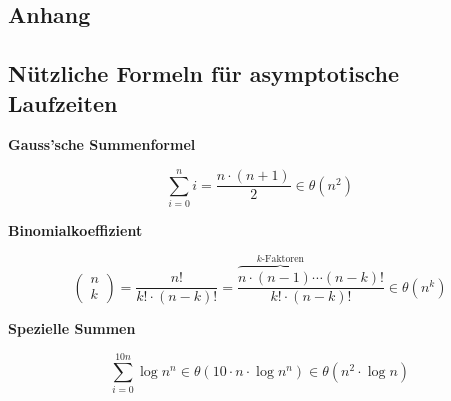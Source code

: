 \vspace{-4pt}
\begin{sectionbox}
\section{Anhang}
\subsection{Nützliche Formeln für asymptotische Laufzeiten}\medskip

\textbf{Gauss'sche Summenformel}\par\vspace{-4px}
\begin{equation*}
    \boxed{\sum\limits_{i=0}^n i = \frac{n \cdot (n+1)}{2} \in \theta \left(n^2\right)}
\end{equation*}\par\smallskip

\textbf{Binomialkoeffizient}\par\vspace{-15px}
\begin{equation*}
    \left(\begin{array}{l} n \\ k \end{array}\right)=\frac{n !}{k ! \cdot(n-k) !} = \frac{ \overbrace{n \cdot (n-1) \cdots}^{k\text{-Faktoren}} (n-k)!}{k! \cdot (n-k)!} \in \theta \left( n^k \right)
\end{equation*}\par\smallskip

\textbf{Spezielle Summen}\par\vspace{-4px}
\begin{equation*}
    \sum\limits_{i=0}^{10n} \log{n^n} \in \theta \left(10 \cdot n \cdot \log{n^n}\right) \in \theta \left(n^2 \cdot \log{n}\right)
\end{equation*}\par\smallskip

\end{sectionbox}

